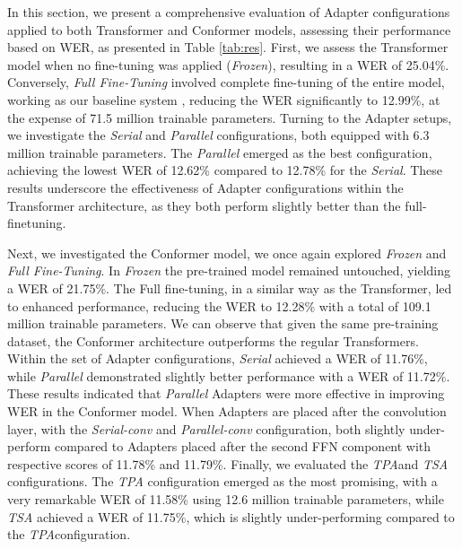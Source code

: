 In this section, we present a comprehensive evaluation of Adapter configurations applied to both Transformer and Conformer models, assessing their performance based on \ac{WER}, as presented in Table \ref{tab:res}.  First, we assess 
the Transformer model when no fine-tuning was applied (\textit{Frozen}), resulting in a \ac{WER} of 25.04\%. Conversely, \textit{Full Fine-Tuning} involved complete fine-tuning of the entire model,
working as our baseline system
, reducing the \ac{WER} significantly to 12.99\%, at the expense of 71.5 million trainable parameters.
Turning to the Adapter setups, we investigate the \textit{Serial} and \textit{Parallel} configurations, both equipped with 6.3 million trainable parameters. The \textit{Parallel} emerged as the best configuration, achieving the lowest \ac{WER} of 12.62\% compared to 12.78\% for the \textit{Serial}. These results underscore the effectiveness of Adapter configurations within the Transformer architecture, as they both perform slightly better than the full-finetuning.

Next, we investigated the Conformer model, we once again explored \textit{Frozen} and \textit{Full Fine-Tuning}. In \textit{Frozen} the pre-trained model remained untouched, yielding a \ac{WER} of 21.75\%. The Full fine-tuning, in a similar way as the Transformer, led to enhanced performance, reducing the \ac{WER} to 12.28\% with a total of 109.1 million trainable parameters. We can observe that given the same pre-training dataset, the Conformer architecture outperforms the regular Transformers. Within the set of Adapter configurations, \textit{Serial} achieved a \ac{WER} of 11.76\%, while \textit{Parallel} demonstrated slightly better performance with a \ac{WER} of 11.72\%. These results indicated that \textit{Parallel} Adapters were more effective in improving \ac{WER} in the Conformer model. When Adapters are placed after the convolution layer, with the \textit{Serial-conv} and \textit{Parallel-conv} configuration, both slightly under-perform compared to Adapters placed after the second \ac{FFN} component with respective scores of 11.78\% and 11.79\%. Finally, we evaluated the \textit{\ac{TPA}}and \textit{\ac{TSA}} configurations. The \textit{\ac{TPA}} configuration emerged as the most promising, with a very remarkable \ac{WER} of 11.58\% using 12.6 million trainable parameters, while \textit{\ac{TSA}} achieved a \ac{WER} of 11.75\%, which is slightly under-performing compared to the \textit{\ac{TPA}}configuration.

